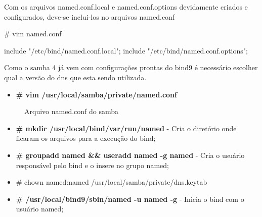 Com os arquivos named.conf.local e named.conf.options devidamente criados e configurados, deve-se inclui-los no arquivos named.conf

\# vim named.conf

include "/etc/bind/named.conf.local";
include "/etc/bind/named.conf.options";


Como o samba 4 já vem com configurações prontas do bind9 é necessário escolher qual a versão do dns que esta sendo utilizada.

\begin{itemize}
	\item \textbf{\# vim /usr/local/samba/private/named.conf}
\end{itemize}

\begin{figure}[ht]
   	\centering
   	\caption{Arquivo named.conf do samba}
    \label{named_conf}
\end{figure}

% 
% 
% 
% 

\begin{itemize}
	\item \textbf{\# mkdir /usr/local/bind/var/run/named} - Cria o diretório onde ficaram os arquivos para a execução do bind;
	\item \textbf{\# groupadd named \&\& useradd named -g named} - Cria o usuário responsável pelo bind e o insere no grupo named;
	\item{\# chown named:named /usr/local/samba/private/dns.keytab}
	\item \textbf{\# /usr/local/bind9/sbin/named -u named -g} - Inicia o bind com o usuário named;
\end{itemize}

